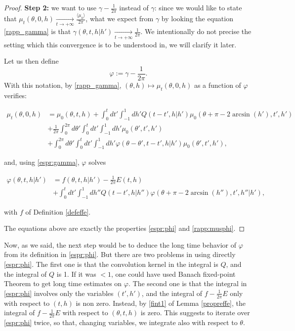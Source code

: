 \documentclass[a4paper,10pt,reqno]{amsart}
\numberwithin{equation}{subsection}
\numberwithin{figure}{subsection}
\begin{document}
\begin{proof}
\textbf{Step 2:} we want to use $\gamma-\frac{1}{2\pi}$ instead of $\gamma$: since we would like to state that $\mu_t(\theta,0,h)\xrightarrow[t\to+\infty]{}\frac{\langle\mu_0\rangle}{2\pi}$, what we expect from $\gamma$ by looking the equation \eqref{rapp_gamma} is that $\gamma(\theta,t,h|h')\xrightarrow[t\to+\infty]{}\frac{1}{2\pi}$. We intentionally do not precise the setting which this convergence is to be understood in, we will clarify it later.

Let us then define
\[
\varphi:=\gamma-\frac{1}{2\pi}.
\]
With this notation, by \eqref{rapp_gamma}, $(\theta,h)\mapsto\mu_t(\theta,0,h)$ as a function of $\varphi$ verifies:

{\small\begin{align*}
\mu_t(\theta,0,h)&=\mu_0(\theta,t,h)+\int_0^tdt'\int_{-1}^1dh'Q(t-t',h|h')\mu_0(\theta+\pi-2\arcsin(h'),t',h')
\\
&+\frac{1}{2\pi}\int_0^{2\pi}d\theta'\int_0^tdt'\int_{-1}^1dh'\mu_0(\theta',t',h')
\\
&+\int_0^{2\pi}d\theta'\int_0^tdt'\int_{-1}^1dh'\varphi(\theta-\theta',t-t',h|h')\mu_0(\theta',t',h'),
\end{align*}}

and, using \eqref{espr:gamma}, $\varphi$ solves

\begin{align*}
\varphi(\theta,t,h|h')&=f(\theta,t,h|h')-\frac{1}{2\pi}E(t,h)
\\
&+\int_0^tdt'\int_{-1}^1dh''Q(t-t',h|h'')\varphi(\theta+\pi-2\arcsin(h''),t',h''|h'),
\end{align*}

with $f$ of Definition \ref{defeffe}.

The equations above are exactly the properties \eqref{espr:phi} and \eqref{rapp:musphi}.
\end{proof}
Now, as we said, the next step would be to deduce the long time behavior of $\varphi$ from its definition in \eqref{espr:phi}. But there are two problems in using directly \eqref{espr:phi}. The first one is that the convolution kernel in the integral is $Q$, and the integral of $Q$ is 1. If it was $<1$, one could have used Banach fixed-point Theorem to get long time estimates on $\varphi$. The second one is that the integral in \eqref{espr:phi} involves only the variables $(t',h')$, and the integral of $f-\frac{1}{2\pi}E$ only with respect to $(t,h)$ is non zero. Instead, by \eqref{fint1} of Lemma \ref{propreffe}, the integral of $f-\frac{1}{2\pi}E$ with respect to $(\theta,t,h)$ is zero. This suggests to iterate over \eqref{espr:phi} twice, so that, changing variables, we integrate also with respect to $\theta$.
\end{document}
